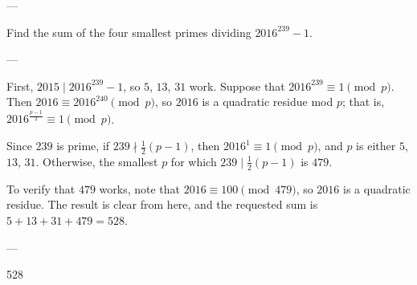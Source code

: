 
---

Find the sum of the four smallest primes dividing $2016^{239}-1$.

---

First, $2015\mid 2016^{239}-1$, so $5$, $13$, $31$ work. Suppose that $2016^{239}\equiv1\pmod p$. Then $2016\equiv2016^{240}\pmod p$, so $2016$ is a quadratic residue mod $p$; that is, $2016^{\frac{p-1}2}\equiv 1\pmod p$.

Since $239$ is prime, if $239\nmid\frac12(p-1)$, then $2016^1\equiv1\pmod p$, and $p$ is either $5$, $13$, $31$. Otherwise, the smallest $p$ for which $239\mid\frac12(p-1)$ is $479$.

To verify that $479$ works, note that $2016\equiv100\pmod{479}$, so $2016$ is a quadratic residue. The result is clear from here, and the requested sum is $5+13+31+479=528$.

---

528

